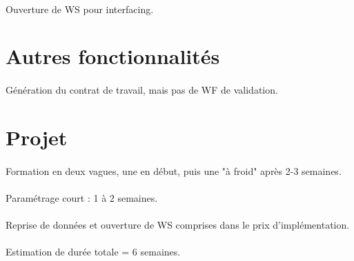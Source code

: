 \paragraph{} Ouverture de WS pour interfacing.


\section{Autres fonctionnalités}
\paragraph{}Génération du contrat de travail, mais pas de WF de validation.

\section{Projet}

\paragraph{} Formation en deux vagues, une en début, puis une "à froid" après 2-3 semaines.

\paragraph{} Paramétrage court : 1 à 2 semaines.
\paragraph{} Reprise de données et ouverture de WS comprises dans le prix d'implémentation.
\paragraph{} Estimation de durée totale = 6 semaines.


